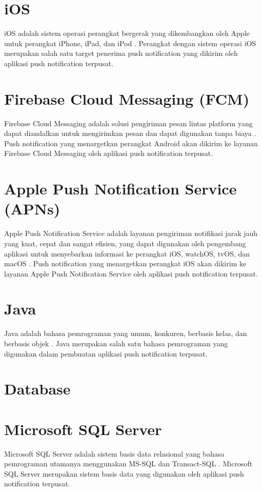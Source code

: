\section{iOS}
\par iOS adalah sistem operasi perangkat bergerak yang dikembangkan oleh Apple untuk perangkat iPhone, iPad, dan iPod \cite{ios-online}. Perangkat dengan sistem operasi iOS merupakan salah satu target penerima push notification yang dikirim oleh aplikasi push notification terpusat.

\section{Firebase Cloud Messaging (FCM)}
\par Firebase Cloud Messaging adalah solusi pengiriman pesan lintas platform yang dapat diandalkan untuk mengirimkan pesan dan dapat digunakan tanpa biaya \cite{fcm-online}. Push notification yang menargetkan perangkat Android akan dikirim ke layanan Firebase Cloud Messaging oleh aplikasi push notification terpusat.

\section{Apple Push Notification Service (APNs)}
\par Apple Push Notification Service adalah layanan pengiriman notifikasi jarak jauh yang kuat, cepat dan sangat efisien, yang dapat digunakan oleh pengembang aplikasi untuk menyebarkan informasi ke perangkat iOS, watchOS, tvOS, dan macOS \cite{apns-online}. Push notification yang menargetkan perangkat iOS akan dikirim ke layanan Apple Push Notification Service oleh aplikasi push notification terpusat.

\section{Java}
\par Java adalah bahasa pemrograman yang umum, konkuren, berbasis kelas, dan berbasis objek \cite{java-online}. Java merupakan salah satu bahasa pemrograman yang digunakan dalam pembuatan aplikasi push notification terpusat.

\section{Database}

\section{Microsoft SQL Server}
\par Microsoft SQL Server adalah sistem basis data relasional yang bahasa pemrograman utamanya menggunakan MS-SQL dan Transact-SQL \cite{sqlserver-thesis}. Microsoft SQL Server merupakan sistem basis data yang digunakan oleh aplikasi push notification terpusat.

